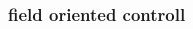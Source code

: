 \documentclass{beamer}
\begin{document}
\begin{frame}
  
  \frametitle{field oriented controll}    

  
  \begin{columns}

    \begin{column}{0.5\textwidth}
    \end{column}


\end{columns}
\end{frame}
\end{document}

